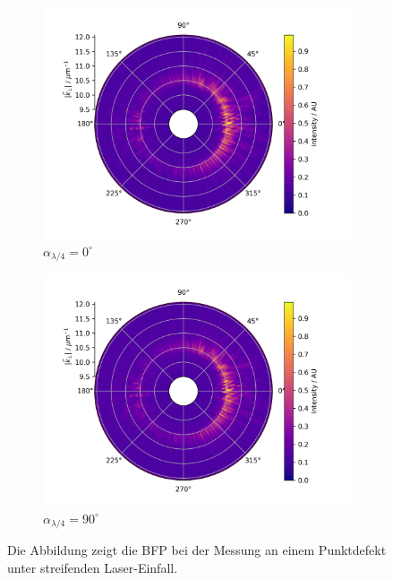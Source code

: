 \documentclass[titlepage]{article}
\begin{document}
\begin{figure}[h!]
		\begin{subfigure}[b]{0.5\textwidth}
			\centering
			\includegraphics[width=\textwidth]{figures/spin_hall/polar/polar_0.png}
			\caption{$\alpha_{\lambda/4} = 0^\circ$}
			\label{fig:dirt_radia_0}
		\end{subfigure}
		\hfill
		\begin{subfigure}[b]{0.49\textwidth}
			\centering
			\includegraphics[width=\textwidth]{figures/spin_hall/polar/polar_90.png}
			\caption{$\alpha_{\lambda/4} = 90^\circ$}
			\label{fig:dirt_radia_90}
		\end{subfigure}
		\caption[BFP in Abhängigkeit der Abstrahlrichtung]{Die Abbildung zeigt die BFP bei der Messung an einem Punktdefekt unter streifenden Laser-Einfall.}			
	\end{figure}
		
\end{document}
